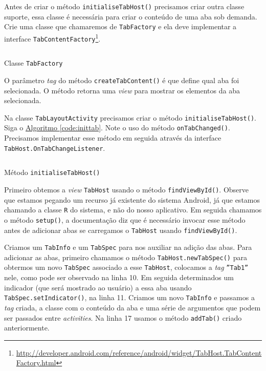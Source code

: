 \documentclass[a4paper,12pt,brazil,oneside]{book}
\begin{document}
	Antes de criar o método \texttt{initialiseTabHost()} precisamos criar outra classe suporte, essa classe é necessária para criar o conteúdo de uma aba sob demanda. Crie uma classe que chamaremos de \texttt{TabFactory} e ela deve implementar a interface \texttt{TabContentFactory}\footnote{\href{http://developer.android.com/reference/android/widget/TabHost.TabContentFactory.html}{http://developer.android.com/reference/android/widget/TabHost.TabContentFactory.html}}.
	
	\begin{listing}[H]
	\inputminted[linenos=true,fontsize=\small,frame=lines, framesep=2mm, tabsize=2,numbersep=5pt]{java}{src/design/tab-factory.java}
	\caption{Classe \texttt{TabFactory}}
	\end{listing}
	
	O parâmetro \emph{tag} do método \texttt{createTabContent()} é que define qual aba foi selecionada. O método retorna uma \emph{view} para mostrar os elementos da aba selecionada.
	
	Na classe \texttt{TabLayoutActivity} precisamos criar o método \texttt{initialiseTabHost()}. Siga o \hyperref[code:inittab]{Algoritmo \ref*{code:inittab}}. Note o uso do método \texttt{onTabChanged()}. Precisamos implementar esse método em seguida através da interface \texttt{TabHost.OnTabChangeListener}.
	
	\begin{listing}[H]
	\inputminted[linenos=true,fontsize=\small,frame=lines, framesep=2mm, tabsize=2,numbersep=5pt]{java}{src/design/intialiseTabHost.java}
	\caption{Método \texttt{initialiseTabHost()}}
	\label{code:inittab}
	\end{listing}
	
	Primeiro obtemos a \emph{view} \texttt{TabHost} usando o método \texttt{findViewById()}. Observe que estamos pegando um recurso já existente do sistema Android, já que estamos chamando a classe \texttt{R} do sistema, e não do nosso aplicativo. Em seguida chamamos o método \texttt{setup()}, a documentação diz que é necessário invocar esse método antes de adicionar abas se carregamos o \texttt{TabHost} usando \texttt{findViewById()}.
	
	Criamos um \texttt{TabInfo} e um \texttt{TabSpec} para nos auxiliar na adição das abas. Para adicionar as abas, primeiro chamamos o método \texttt{TabHost.newTabSpec()} para obtermos um novo \texttt{TabSpec} associado a esse \texttt{TabHost}, colocamos a \emph{tag} \texttt{''Tab1''} nele, como pode ser observado na linha 10. Em seguida determinados um indicador (que será mostrado ao usuário) a essa aba usando \texttt{TabSpec.setIndicator()}, na linha 11. Criamos um novo \texttt{TabInfo} e passamos a \emph{tag} criada, a classe com o conteúdo da aba e uma série de argumentos que podem ser passados entre \emph{activities}. Na linha 17 usamos o método \texttt{addTab()} criado anteriormente.
		
\end{document}
